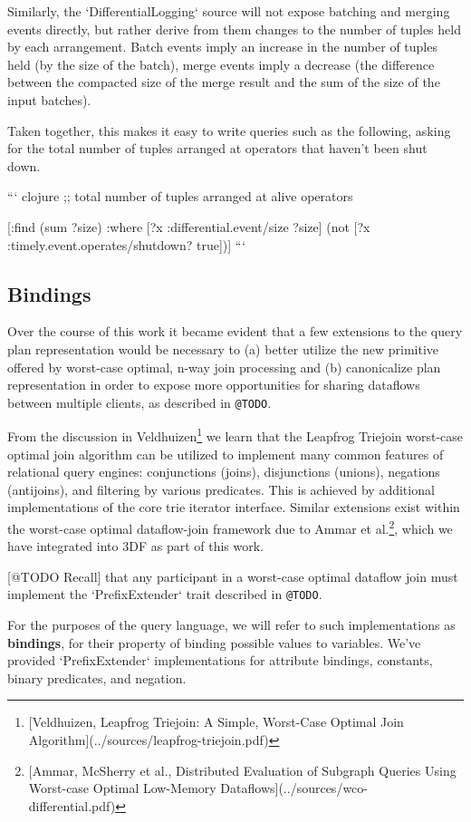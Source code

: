 \documentclass[../index.tex]{subfiles}
\begin{document}
Similarly, the `DifferentialLogging` source will not expose batching
and merging events directly, but rather derive from them changes to
the number of tuples held by each arrangement. Batch events imply an
increase in the number of tuples held (by the size of the batch),
merge events imply a decrease (the difference between the compacted
size of the merge result and the sum of the size of the input
batches).

Taken together, this makes it easy to write queries such as the
following, asking for the total number of tuples arranged at operators
that haven't been shut down.

``` clojure
;; total number of tuples arranged at alive operators

[:find (sum ?size)
 :where
 [?x :differential.event/size ?size]
 (not [?x :timely.event.operates/shutdown? true])]
```

\subsection{Bindings}

Over the course of this work it became evident that a few extensions
to the query plan representation would be necessary to (a) better
utilize the new primitive offered by worst-case optimal, n-way join
processing and (b) canonicalize plan representation in order to expose
more opportunities for sharing dataflows between multiple clients, as
described in \texttt{@TODO}.

From the discussion in Veldhuizen\footnote{[Veldhuizen, Leapfrog Triejoin: A Simple, Worst-Case Optimal Join Algorithm](../sources/leapfrog-triejoin.pdf)} we learn that the Leapfrog
Triejoin worst-case optimal join algorithm can be utilized to
implement many common features of relational query engines:
conjunctions (joins), disjunctions (unions), negations (antijoins),
and filtering by various predicates. This is achieved by additional
implementations of the core trie iterator interface. Similar
extensions exist within the worst-case optimal dataflow-join framework
due to Ammar et al.\footnote{[Ammar, McSherry et al., Distributed Evaluation of Subgraph Queries Using Worst-case Optimal Low-Memory Dataflows](../sources/wco-differential.pdf)}, which we have integrated into 3DF as part of
this work.

[@TODO Recall] that any participant in a worst-case optimal dataflow
join must implement the `PrefixExtender` trait described in
\texttt{@TODO}.

For the purposes of the query language, we will refer to such
implementations as \textbf{bindings}, for their property of binding possible
values to variables. We've provided `PrefixExtender` implementations
for attribute bindings, constants, binary predicates, and negation.
\end{document}
